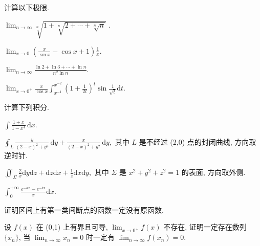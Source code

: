 \par{}
计算以下极限.\par
$\lim_{n\to\infty}\sqrt[n]{1+\sqrt[n]{2+\cdots+\sqrt[n]{n}}}$ .\par
$\lim_{x\to0}\left(\frac{x}{\sin x}-\cos x+1\right)\frac{1}{x}.$\par
$\lim_{n\to\infty}\frac{\ln2+\ln3+\cdots+\ln n}{n^{2}\ln n}.$\par
$\lim_{x\to 0^{+}}\frac{x}{\cos x}\int_{x^{-1}}^{x^{-2}}\left(1 + \frac{1}{2t}\right)^{t}\sin \frac{1}{\sqrt{t}}\mathrm{d}t.$\par
\par{}
计算下列积分.\par
$\int \frac{1 + x}{1 - x^4} \, \mathrm{d}x.$\par
$\oint_{L} \frac{y}{(2 - x)^{2} + y^{2}} \, \mathrm{d}y + \frac{x}{(2 - x)^{2} + y^{2}} \, \mathrm{d}y,$ 其中 $L$ 是不经过 (2,0) 点的封闭曲线, 方向取逆时针.\par
$\iint_{\Sigma} \frac{2}{x} \mathrm{d}y \mathrm{d}z + \mathrm{d}z \mathrm{d}x + \frac{1}{z} \mathrm{d}x \mathrm{d}y,$ 其中 $\Sigma$ 是 $x^{2} + y^{2} + z^{2} = 1$ 的表面, 方向取外侧.\par
$\int_0^{+\infty}\frac{e^{-ax} - e^{-bx}}{x}\mathrm{d}x.$\par
\par{}
证明区间上有第一类间断点的函数一定没有原函数.\par
\par{}
设 $f(x)$ 在 (0,1) 上有界且可导, $\lim_{x\to 0^{+}}f(x)$ 不存在, 证明一定存在数列 $\{x_n\}$, 当 $\lim_{n\to \infty}x_n = 0$ 时一定有 $\lim_{n\to \infty}f(x_n) = 0$.\par
